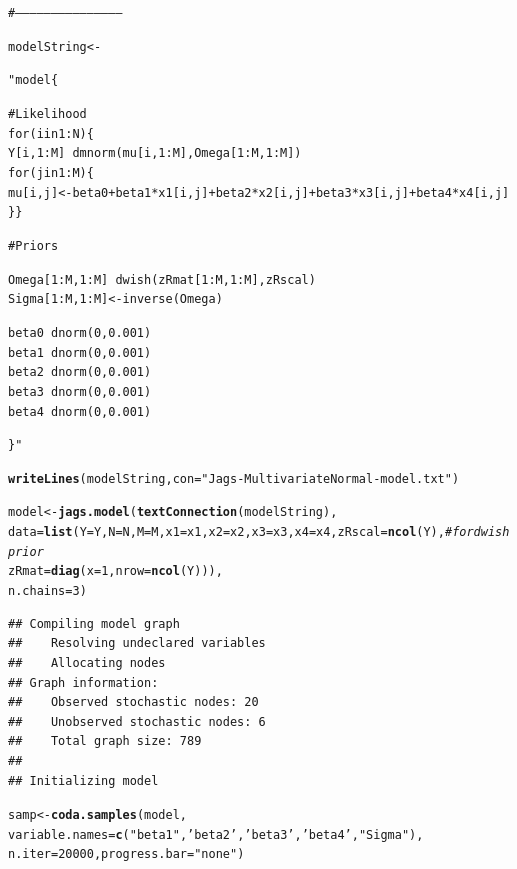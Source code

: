 \documentclass[11pt,a4paper,twoside]{book}
\makeatletter
\newcommand{\hlnum}[1]{\textcolor[rgb]{0.686,0.059,0.569}{#1}}%
\newcommand{\hlstr}[1]{\textcolor[rgb]{0.192,0.494,0.8}{#1}}%
\newcommand{\hlcom}[1]{\textcolor[rgb]{0.678,0.584,0.686}{\textit{#1}}}%
\newcommand{\hlstd}[1]{\textcolor[rgb]{0.345,0.345,0.345}{#1}}%
\newcommand{\hlkwb}[1]{\textcolor[rgb]{0.69,0.353,0.396}{#1}}%
\newcommand{\hlkwc}[1]{\textcolor[rgb]{0.333,0.667,0.333}{#1}}%
\newcommand{\hlkwd}[1]{\textcolor[rgb]{0.737,0.353,0.396}{\textbf{#1}}}%
\newenvironment{kframe}{%
 \def\at@end@of@kframe{}%
 \ifinner\ifhmode%
  \def\at@end@of@kframe{\end{minipage}}%
  \begin{minipage}{\columnwidth}%
 \fi\fi%
 \def\FrameCommand##1{\hskip\@totalleftmargin \hskip-\fboxsep
 \colorbox{shadecolor}{##1}\hskip-\fboxsep
     \hskip-\linewidth \hskip-\@totalleftmargin \hskip\columnwidth}%
 \MakeFramed {\advance\hsize-\width
   \@totalleftmargin\z@ \linewidth\hsize
   \@setminipage}}%
 {\par\unskip\endMakeFramed%
 \at@end@of@kframe}
\newenvironment{knitrout}{}{} %
\makeatother
\begin{document}
\begin{knitrout}
\color{fgcolor}\begin{kframe}
\begin{alltt}
\hlcom{#--------------------------------------------}

\hlstd{modelString} \hlkwb{<-} \hlstr{"model\{

# Likelihood
for(i in 1:N)\{
Y[i,1:M] ~ dmnorm(mu[i,1:M],Omega[1:M,1:M])
for(j in 1:M)\{
mu[i,j] <- beta0 + beta1*x1[i,j]+ beta2*x2[i,j]+ beta3*x3[i,j] + beta4*x4[i,j]  
\}\}

# Priors

Omega[1:M, 1:M] ~dwish(zRmat[1:M,1:M] , zRscal)
Sigma[1:M, 1:M] <- inverse(Omega)

beta0      ~ dnorm(0,0.001)
beta1      ~ dnorm(0,0.001)
beta2      ~ dnorm(0,0.001)
beta3      ~ dnorm(0,0.001)
beta4      ~ dnorm(0,0.001)

\}"}


\hlkwd{writeLines}\hlstd{( modelString ,} \hlkwc{con}\hlstd{=}\hlstr{"Jags-MultivariateNormal-model.txt"} \hlstd{)}

\hlstd{model} \hlkwb{<-} \hlkwd{jags.model}\hlstd{(}\hlkwd{textConnection}\hlstd{(modelString),}
                                                                                \hlkwc{data} \hlstd{=} \hlkwd{list}\hlstd{(}\hlkwc{Y}\hlstd{=Y,}\hlkwc{N}\hlstd{=N,}\hlkwc{M}\hlstd{=M,}\hlkwc{x1} \hlstd{= x1,} \hlkwc{x2} \hlstd{= x2,} \hlkwc{x3} \hlstd{= x3,} \hlkwc{x4} \hlstd{= x4,}     \hlkwc{zRscal} \hlstd{=} \hlkwd{ncol}\hlstd{(Y) ,}  \hlcom{# for dwish prior}
                                                                                                                                \hlkwc{zRmat} \hlstd{=} \hlkwd{diag}\hlstd{(}\hlkwc{x}\hlstd{=}\hlnum{1}\hlstd{,}\hlkwc{nrow}\hlstd{=}\hlkwd{ncol}\hlstd{(Y)) ),}
                                                                                \hlkwc{n.chains}\hlstd{=}\hlnum{3}\hlstd{)}
\end{alltt}
\begin{verbatim}
## Compiling model graph
##    Resolving undeclared variables
##    Allocating nodes
## Graph information:
##    Observed stochastic nodes: 20
##    Unobserved stochastic nodes: 6
##    Total graph size: 789
## 
## Initializing model
\end{verbatim}
\begin{alltt}
\hlstd{samp} \hlkwb{<-} \hlkwd{coda.samples}\hlstd{(model,}
                                                                                 \hlkwc{variable.names}\hlstd{=}\hlkwd{c}\hlstd{(}\hlstr{"beta1"}\hlstd{,}\hlstr{'beta2'}\hlstd{,} \hlstr{'beta3'}\hlstd{,} \hlstr{'beta4'} \hlstd{,}\hlstr{"Sigma"}\hlstd{),}
                                                                                 \hlkwc{n.iter}\hlstd{=}\hlnum{20000}\hlstd{,} \hlkwc{progress.bar}\hlstd{=}\hlstr{"none"}\hlstd{)}


\end{alltt}
\end{kframe}
\end{knitrout}
\end{document}
